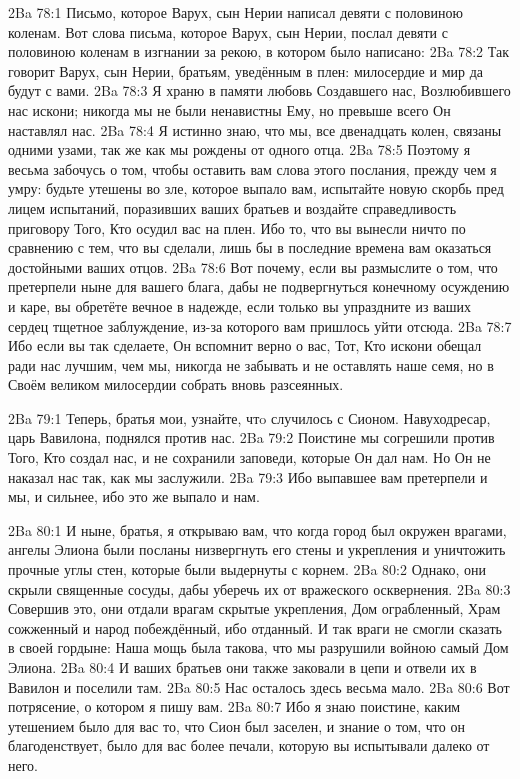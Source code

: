 \vs 2Ba 78:1
Письмо, которое Варух, сын Нерии написал девяти с половиною коленам. Вот слова письма, которое Варух, сын Нерии, послал девяти с половиною коленам в изгнании за рекою, в котором было написано:
\vs 2Ba 78:2
Так говорит Варух, сын Нерии, братьям, уведённым в плен: милосердие и мир да будут с вами.
\vs 2Ba 78:3
Я храню в памяти любовь Создавшего нас, Возлюбившего нас искони; никогда мы не были ненавистны Ему, но превыше всего Он наставлял нас.
\vs 2Ba 78:4
Я истинно знаю, что мы, все двенадцать колен, связаны одними узами, так же как мы рождены от одного отца.
\vs 2Ba 78:5
Поэтому я весьма забочусь о том, чтобы оставить вам слова этого послания, прежду чем я умру: будьте утешены во зле, которое выпало вам, испытайте новую скорбь пред лицем испытаний, поразивших ваших братьев и воздайте справедливость приговору Того, Кто осудил вас на плен. Ибо то, что вы вынесли ничто по сравнению с тем, что вы сделали, лишь бы в последние времена вам оказаться достойными ваших отцов.
\vs 2Ba 78:6
Вот почему, если вы размыслите о том, что претерпели ныне для вашего блага, дабы не подвергнуться конечному осуждению и каре, вы обретёте вечное в надежде, если только вы упраздните из ваших сердец тщетное заблуждение, из-за которого вам пришлось уйти отсюда.
\vs 2Ba 78:7
Ибо если вы так сделаете, Он вспомнит верно о вас, Тот, Кто искони обещал ради нас лучшим, чем мы, никогда не забывать и не оставлять наше семя, но в Своём великом милосердии собрать вновь разсеянных.

\vs 2Ba 79:1
Теперь, братья мои, узнайте, чтo случилось с Сионом. Навуходресар, царь Вавилона, поднялся против нас.
\vs 2Ba 79:2
Поистине мы согрешили против Того, Кто создал нас, и не сохранили заповеди, которые Он дал нам. Но Он не наказал нас так, как мы заслужили.
\vs 2Ba 79:3
Ибо выпавшее вам претерпели и мы, и сильнее, ибо это же выпало и нам.

\vs 2Ba 80:1
И ныне, братья, я открываю вам, что когда город был окружен врагами, ангелы Элиона были посланы низвергнуть его стены и укрепления и уничтожить прочные углы стен, которые были выдернуты с корнем.
\vs 2Ba 80:2
Однако, они скрыли священные сосуды, дабы уберечь их от вражеского осквернения.
\vs 2Ba 80:3
Совершив это, они отдали врагам скрытые укрепления, Дом ограбленный, Храм сожженный и народ побеждённый, ибо отданный. И так враги не смогли сказать в своей гордыне: Наша мощь была такова, что мы разрушили войною самый Дом Элиона.
\vs 2Ba 80:4
И ваших братьев они также заковали в цепи и отвели их в Вавилон и поселили там.
\vs 2Ba 80:5
Нас осталось здесь весьма мало.
\vs 2Ba 80:6
Вот потрясение, о котором я пишу вам.
\vs 2Ba 80:7
Ибо я знаю поистине, каким утешением было для вас то, что Сион был заселен, и знание о том, что он благоденствует, было для вас более печали, которую вы испытывали далеко от него.

